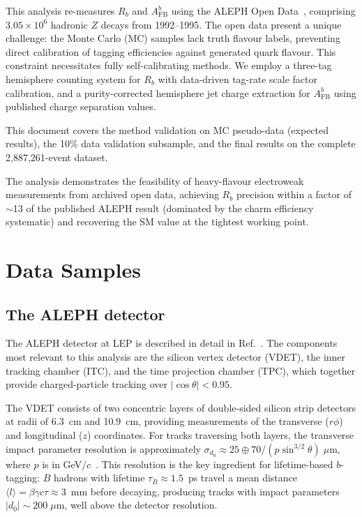 \documentclass[11pt,a4paper]{article}
\begin{document}
This analysis re-measures $R_b$ and $A_\text{FB}^b$ using the ALEPH
Open Data~\cite{ALEPH:opendata}, comprising $3.05 \times 10^6$ hadronic
$Z$ decays from 1992--1995.
The open data present a unique challenge: the Monte Carlo (MC) samples
lack truth flavour labels, preventing direct calibration of tagging
efficiencies against generated quark flavour.
This constraint necessitates fully self-calibrating methods.
We employ a three-tag hemisphere counting system for $R_b$ with
data-driven tag-rate scale factor calibration, and a purity-corrected
hemisphere jet charge extraction for $A_\text{FB}^b$ using published
charge separation values.

This document covers the method validation on MC pseudo-data
(expected results), the 10\% data validation subsample, and the
final results on the complete 2,887,261-event dataset.

The analysis demonstrates the feasibility of heavy-flavour
electroweak measurements from archived open data, achieving
$R_b$ precision within a factor of $\sim$13 of the published ALEPH
result (dominated by the charm efficiency systematic) and
recovering the SM value at the tightest working point.

\section{Data Samples}
\label{sec:data}

\subsection{The ALEPH detector}
\label{sec:data:detector}

The ALEPH detector at LEP is described in detail
in Ref.~\cite{ALEPH:sigma_had}.
The components most relevant to this analysis are the silicon
vertex detector (VDET), the inner tracking chamber (ITC), and
the time projection chamber (TPC), which together provide
charged-particle tracking over $|\cos\theta| < 0.95$.

The VDET consists of two concentric layers of double-sided silicon
strip detectors at radii of 6.3~cm and 10.9~cm, providing
measurements of the transverse ($r\phi$) and longitudinal ($z$)
coordinates.
For tracks traversing both layers, the transverse impact parameter
resolution is approximately
$\sigma_{d_0} \approx 25 \oplus 70/(p\sin^{3/2}\theta)\;\mu$m,
where $p$ is in GeV/$c$~\cite{ALEPH:Rb:precise}.
This resolution is the key ingredient for lifetime-based $b$-tagging:
$B$ hadrons with lifetime $\tau_B \approx 1.5$~ps travel a mean
distance $\langle l \rangle = \beta\gamma c\tau \approx 3$~mm
before decaying, producing tracks with impact parameters
$|d_0| \sim 200\;\mu$m, well above the detector resolution.
\end{document}

